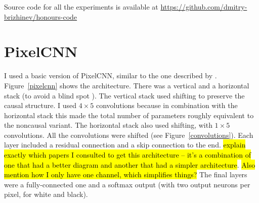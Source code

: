 \documentclass[11pt, a4paper, openany]{book}
\begin{document}
Source code for all the experiments is available at \url{https://github.com/dmitry-brizhinev/honours-code}

\section{PixelCNN}

I used a basic version of PixelCNN, similar to the one described by \citet{pixelcnn2}. Figure~\ref{pixelcnn} shows the architecture. There was a vertical and a horizontal stack (to avoid a blind spot \citep{pixelcnn2}). The vertical stack used shifting to preserve the causal structure. I used $4\times 5$ convolutions because in combination with the horizontal stack this made the total number of parameters roughly equivalent to the noncausal variant. The horizontal stack also used shifting, with $1\times 5$ convolutions. All the convolutions were shifted (see Figure~\ref{convolutions}). Each layer included a residual connection and a skip connection to the end. \hl{explain exactly which papers I consulted to get this architecture -- it's a combination of one that had a better diagram and another that had a simpler architecture}. \hl{Also mention how I only have one channel, which simplifies things?} The final layers were a fully-connected one and a softmax output (with two output neurons per pixel, for white and black).
\end{document}
